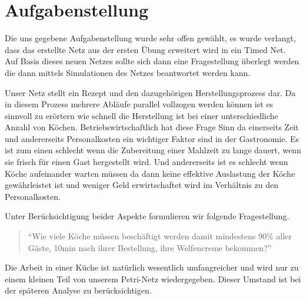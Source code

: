 \section*{Aufgabenstellung} %
\label{sec:aufgabenstellung}
Die uns gegebene Aufgabenstellung wurde sehr offen gewählt, es wurde verlangt, dass das erstellte Netz aus der ersten Übung erweitert wird in ein Timed Net. Auf Basis dieses neuen Netzes sollte sich dann eine Fragestellung überlegt werden die dann mittels Simulationen des Netzes beantwortet werden kann.

Unser Netz stellt ein Rezept und den dazugehörigen Herstellungsprozess dar. Da in diesem Prozess mehrere Abläufe parallel vollzogen werden können ist es sinnvoll zu erörtern wie schnell die Herstellung ist bei einer unterschiedliche Anzahl von Köchen. Betriebswirtschaftlich hat diese Frage Sinn da einerseits Zeit und andererseits Personalkosten ein wichtiger Faktor sind in der Gastronomie. Es ist zum einen schlecht wenn die Zubereitung einer Mahlzeit zu lange dauert, wenn sie frisch für einen Gast hergestellt wird. Und andererseits ist es schlecht wenn Köche aufeinander warten müssen da dann keine effektive Auslastung der Köche gewährleistet ist und weniger Geld erwirtschaftet wird im Verhältnis zu den Personalkosten.

Unter Berücksichtigung beider Aspekte formulieren wir folgende Fragestellung.

\begin{quote} 
\begin{tt}
\begin{center}
``Wie viele Köche müssen beschäftigt werden damit mindestens 90\% aller Gäste, 10min nach ihrer Bestellung, ihre Welfencreme bekommen?'' 
\end{center}
\end{tt}
\end{quote}
Die Arbeit in einer Küche ist natürlich wesentlich umfangreicher und wird nur zu einem kleinen Teil von unserem Petri-Netz wiedergegeben. Dieser Umstand ist bei der späteren Analyse zu berücksichtigen.





